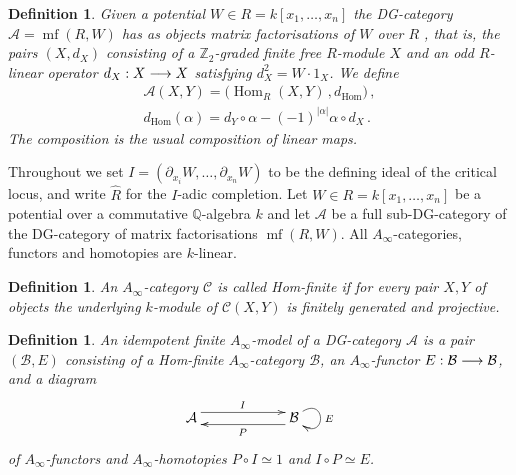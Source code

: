 \documentclass[english,letter paper,12pt,leqno]{article}
\theoremstyle{example}
\newtheorem{definition}[theorem]{Definition}
\newtheorem{remark}[theorem]{Remark}
\numberwithin{equation}{section}
\def\AA{\mathcal{A}}
\def\BB{\mathcal{B}}
\def\Hom{\operatorname{Hom}}
\def\nQ{\mathds{Q}}
\DeclareMathOperator{\mfdg}{mf}
\begin{document}
\begin{definition} Given a potential $W \in R = k[x_1,\ldots,x_n]$ the DG-category $\AA = \mfdg(R,W)$ has as objects \emph{matrix factorisations} of $W$ over $R$ \cite{eisenbud}, that is, the pairs $(X, d_X)$ consisting of a $\mathbb{Z}_2$-graded finite free $R$-module $X$ and an odd $R$-linear operator $d_X: X \longrightarrow X$ satisfying $d_X^2 = W \cdot 1_X$. We define
\begin{gather*}
\AA(X,Y) = \big( \Hom_R(X,Y) \,, d_{\Hom} \big)\,,\\
d_{\Hom}(\alpha)  = d_Y \circ \alpha - (-1)^{|\alpha|} \alpha \circ d_X\,.
\end{gather*}
The composition is the usual composition of linear maps.
\end{definition}

Throughout we set $I = ( \partial_{x_i} W, \ldots, \partial_{x_n} W )$ to be the defining ideal of the critical locus, and write $\widehat{R}$ for the $I$-adic completion. Let $W \in R = k[x_1,\ldots,x_n]$ be a potential over a commutative $\nQ$-algebra $k$ and let $\AA$ be a full sub-DG-category of the DG-category of matrix factorisations $\mfdg( R, W )$. All $A_\infty$-categories, functors and homotopies are $k$-linear.

\begin{definition} An $A_\infty$-category $\mathcal{C}$ is called \emph{Hom-finite} if for every pair $X,Y$ of objects the underlying $k$-module of $\mathcal{C}(X,Y)$ is finitely generated and projective.
\end{definition}

\begin{definition} An \emph{idempotent finite $A_\infty$-model} of a DG-category $\AA$ is a pair $(\BB, E)$ consisting of a Hom-finite $A_\infty$-category $\BB$, an $A_\infty$-functor $E: \BB \lto \BB$, and a diagram
\[
\xymatrix@C+3pc{
\AA \ar@<1ex>[r]^I & \BB \ar@(ur,dr)^E \ar@<1ex>[l]^P
}
\]
of $A_\infty$-functors and $A_\infty$-homotopies $P \circ I \simeq 1$ and $I \circ P \simeq E$. %
\end{definition}

\end{document}
